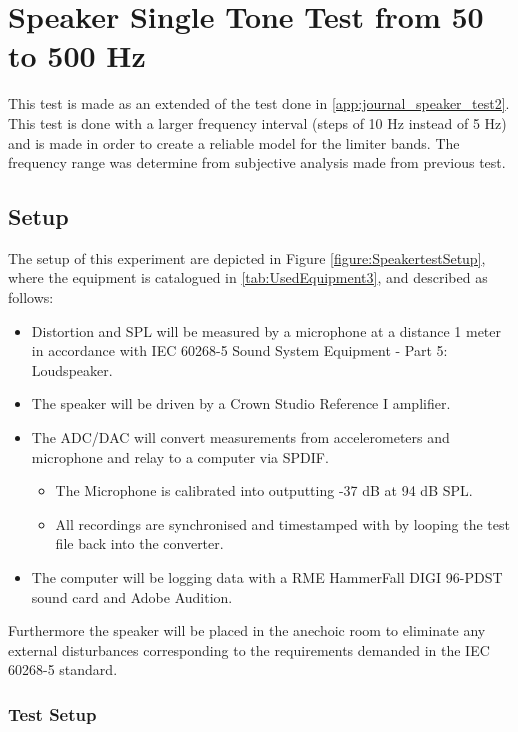 \chapter{Speaker Single Tone Test from 50 to 500 Hz} \label{app:journal_speaker_test3}

This test is made as an extended of the test done in \autoref{app:journal_speaker_test2}. This test is done with a larger frequency interval (steps of 10 Hz instead of 5 Hz) and is made in order to create a reliable model for the limiter bands. The frequency range was determine from subjective analysis made from previous test.


\section{Setup}

The setup of this experiment are depicted in Figure \ref{figure:SpeakertestSetup}, where the equipment is catalogued in \autoref{tab:UsedEquipment3}, and described as follows:
\vspace{-5mm}
\begin{itemize}
\item Distortion and \gls{SPL} will be measured by a microphone at a distance 1 meter in accordance with IEC 60268-5 Sound System Equipment - Part 5: Loudspeaker.
\item The speaker will be driven by a Crown Studio Reference I amplifier.
\item The ADC/DAC will convert measurements from accelerometers and microphone and relay to a computer via SPDIF.
\begin{itemize}
\item The Microphone is calibrated into outputting -37 dB at 94 dB \gls{SPL}.
\item All recordings are synchronised and timestamped with by looping the test file back into the converter.
\end{itemize}
\item The computer will be logging data with a RME HammerFall DIGI 96-PDST sound card and Adobe Audition.
\end{itemize}
\vspace{-5mm}
Furthermore the speaker will be placed in the anechoic room to eliminate any external disturbances corresponding to the requirements demanded in the 
IEC 60268-5 standard.

\subsection*{Test Setup}

